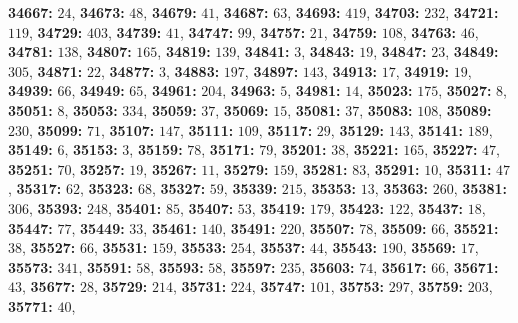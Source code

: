 \textsf{\bfseries 34667:} $24$, \textsf{\bfseries 34673:} $48$, \textsf{\bfseries 34679:} $41$, \textsf{\bfseries 34687:} $63$, \textsf{\bfseries 34693:} $419$, \textsf{\bfseries 34703:} $232$, \textsf{\bfseries 34721:} $119$, \textsf{\bfseries 34729:} $403$, \textsf{\bfseries 34739:} $41$, \textsf{\bfseries 34747:} $99$, \textsf{\bfseries 34757:} $21$, \textsf{\bfseries 34759:} $108$, \textsf{\bfseries 34763:} $46$, \textsf{\bfseries 34781:} $138$, \textsf{\bfseries 34807:} $165$, \textsf{\bfseries 34819:} $139$, \textsf{\bfseries 34841:} $3$, \textsf{\bfseries 34843:} $19$, \textsf{\bfseries 34847:} $23$, \textsf{\bfseries 34849:} $305$, \textsf{\bfseries 34871:} $22$, \textsf{\bfseries 34877:} $3$, \textsf{\bfseries 34883:} $197$, \textsf{\bfseries 34897:} $143$, \textsf{\bfseries 34913:} $17$, \textsf{\bfseries 34919:} $19$, \textsf{\bfseries 34939:} $66$, \textsf{\bfseries 34949:} $65$, \textsf{\bfseries 34961:} $204$, \textsf{\bfseries 34963:} $5$, \textsf{\bfseries 34981:} $14$, \textsf{\bfseries 35023:} $175$, \textsf{\bfseries 35027:} $8$, \textsf{\bfseries 35051:} $8$, \textsf{\bfseries 35053:} $334$, \textsf{\bfseries 35059:} $37$, \textsf{\bfseries 35069:} $15$, \textsf{\bfseries 35081:} $37$, \textsf{\bfseries 35083:} $108$, \textsf{\bfseries 35089:} $230$, \textsf{\bfseries 35099:} $71$, \textsf{\bfseries 35107:} $147$, \textsf{\bfseries 35111:} $109$, \textsf{\bfseries 35117:} $29$, \textsf{\bfseries 35129:} $143$, \textsf{\bfseries 35141:} $189$, \textsf{\bfseries 35149:} $6$, \textsf{\bfseries 35153:} $3$, \textsf{\bfseries 35159:} $78$, \textsf{\bfseries 35171:} $79$, \textsf{\bfseries 35201:} $38$, \textsf{\bfseries 35221:} $165$, \textsf{\bfseries 35227:} $47$, \textsf{\bfseries 35251:} $70$, \textsf{\bfseries 35257:} $19$, \textsf{\bfseries 35267:} $11$, \textsf{\bfseries 35279:} $159$, \textsf{\bfseries 35281:} $83$, \textsf{\bfseries 35291:} $10$, \textsf{\bfseries 35311:} $47$, \textsf{\bfseries 35317:} $62$, \textsf{\bfseries 35323:} $68$, \textsf{\bfseries 35327:} $59$, \textsf{\bfseries 35339:} $215$, \textsf{\bfseries 35353:} $13$, \textsf{\bfseries 35363:} $260$, \textsf{\bfseries 35381:} $306$, \textsf{\bfseries 35393:} $248$, \textsf{\bfseries 35401:} $85$, \textsf{\bfseries 35407:} $53$, \textsf{\bfseries 35419:} $179$, \textsf{\bfseries 35423:} $122$, \textsf{\bfseries 35437:} $18$, \textsf{\bfseries 35447:} $77$, \textsf{\bfseries 35449:} $33$, \textsf{\bfseries 35461:} $140$, \textsf{\bfseries 35491:} $220$, \textsf{\bfseries 35507:} $78$, \textsf{\bfseries 35509:} $66$, \textsf{\bfseries 35521:} $38$, \textsf{\bfseries 35527:} $66$, \textsf{\bfseries 35531:} $159$, \textsf{\bfseries 35533:} $254$, \textsf{\bfseries 35537:} $44$, \textsf{\bfseries 35543:} $190$, \textsf{\bfseries 35569:} $17$, \textsf{\bfseries 35573:} $341$, \textsf{\bfseries 35591:} $58$, \textsf{\bfseries 35593:} $58$, \textsf{\bfseries 35597:} $235$, \textsf{\bfseries 35603:} $74$, \textsf{\bfseries 35617:} $66$, \textsf{\bfseries 35671:} $43$, \textsf{\bfseries 35677:} $28$, \textsf{\bfseries 35729:} $214$, \textsf{\bfseries 35731:} $224$, \textsf{\bfseries 35747:} $101$, \textsf{\bfseries 35753:} $297$, \textsf{\bfseries 35759:} $203$, \textsf{\bfseries 35771:} $40$, 
